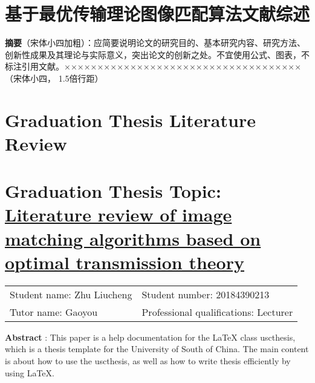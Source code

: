 \maketitle%
\intobmk\section*{基于最优传输理论图像匹配算法文献综述}%

\vspace*{10pt}
   
\thispagestyle{plain}
\setcounter{page}{1}%

\noindent
\textbf{摘要}（宋体小四加粗）：应简要说明论文的研究目的、基本研究内容、研究方法、创新性成果及其理论与实际意义，突出论文的创新之处。不宜使用公式、图表，不标注引用文献。××××××××××××××××××××××××××××××××××××（宋体小四， 1.5倍行距）


\intobmk\section*{\textbf{Graduation Thesis Literature Review}}
\vspace*{20pt}

\intobmk\section*{\textbf{Graduation Thesis Topic:}  \uline{Literature review of image matching algorithms based on optimal transmission theory}}

\begin{tabular}{ll}\centering
    Student name: Zhu Liucheng     &    Student number: 20184390213 \\
    Tutor name:   Gaoyou           &    Professional qualifications: Lecturer
\end{tabular}

\vspace*{20pt}

\noindent
\textbf{Abstract} : This paper is a help documentation for the \LaTeX{} class uscthesis, which is  a thesis template for the University of South of China. The main content is about how to use the uscthesis, as well as how to write thesis efficiently by using \LaTeX{}.

